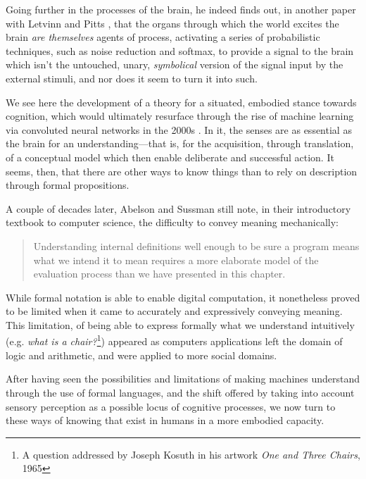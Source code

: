 Going further in the processes of the brain, he indeed finds out, in another paper with Letvinn and Pitts \citep{lettvin_what_1959}, that the organs through which the world excites the brain \emph{are themselves} agents of process, activating a series of probabilistic techniques, such as noise reduction and softmax, to provide a signal to the brain which isn't the untouched, unary, \emph{symbolical} version of the signal input by the external stimuli, and nor does it seem to turn it into such.

We see here the development of a theory for a situated, embodied stance towards cognition, which would ultimately resurface through the rise of machine learning via convoluted neural networks in the 2000s \citep{nilsson_quest_2009}. In it, the senses are as essential as the brain for an understanding—that is, for the acquisition, through translation, of a conceptual model which then enable deliberate and successful action. It seems, then, that there are other ways to know things than to rely on description through formal propositions.

\vspace{1\baselineskip}

A couple of decades later, Abelson and Sussman still note, in their introductory textbook to computer science, the difficulty to convey meaning mechanically:

\begin{quote}
    Understanding internal definitions well enough to be sure a program means what we intend it to mean requires a more elaborate model of the evaluation process than we have presented in this chapter. \citep{abelson_structure_1979}
\end{quote}

While formal notation is able to enable digital computation, it nonetheless proved to be limited when it came to accurately and expressively  conveying meaning. This limitation, of being able to express formally what we understand intuitively (e.g. \emph{what is a chair?}\footnote{A question addressed by Joseph Kosuth in his artwork \emph{One and Three Chairs}, 1965}) appeared as computers applications left the domain of logic and arithmetic, and were applied to more social domains.

After having seen the possibilities and limitations of making machines understand through the use of formal languages, and the shift offered by taking into account sensory perception as a possible locus of cognitive processes, we now turn to these ways of knowing that exist in humans in a more embodied capacity.

